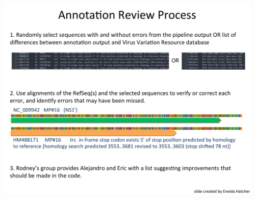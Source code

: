 \documentclass[landscape]{slides}
\begin{document}
\begin{slide}
\begin{center}
\includegraphics[height=8in]{figs/eneida-slide-1}
\vfill
\end{center}
\end{slide}
\end{document}
